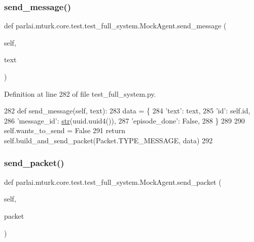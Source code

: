 \subsubsection{\texorpdfstring{send\+\_\+message()}{send\_message()}}
{\footnotesize\ttfamily def parlai.\+mturk.\+core.\+test.\+test\+\_\+full\+\_\+system.\+Mock\+Agent.\+send\+\_\+message (\begin{DoxyParamCaption}\item[{}]{self,  }\item[{}]{text }\end{DoxyParamCaption})}



Definition at line 282 of file test\+\_\+full\+\_\+system.\+py.


\begin{DoxyCode}
282     \textcolor{keyword}{def }send\_message(self, text):
283         data = \{
284             \textcolor{stringliteral}{'text'}: text,
285             \textcolor{stringliteral}{'id'}: self.id,
286             \textcolor{stringliteral}{'message\_id'}: \hyperlink{namespacegenerate__task__READMEs_a5b88452ffb87b78c8c85ececebafc09f}{str}(uuid.uuid4()),
287             \textcolor{stringliteral}{'episode\_done'}: \textcolor{keyword}{False},
288         \}
289 
290         self.wants\_to\_send = \textcolor{keyword}{False}
291         \textcolor{keywordflow}{return} self.build\_and\_send\_packet(Packet.TYPE\_MESSAGE, data)
292 
\end{DoxyCode}
\mbox{\label{classparlai_1_1mturk_1_1core_1_1test_1_1test__full__system_1_1MockAgent_a0a286b82f9e0758cdfabf9b7fb51e6b6}} 
\subsubsection{\texorpdfstring{send\+\_\+packet()}{send\_packet()}}
{\footnotesize\ttfamily def parlai.\+mturk.\+core.\+test.\+test\+\_\+full\+\_\+system.\+Mock\+Agent.\+send\+\_\+packet (\begin{DoxyParamCaption}\item[{}]{self,  }\item[{}]{packet }\end{DoxyParamCaption})}



